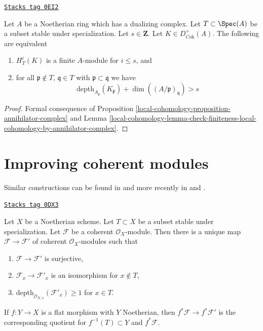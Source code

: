 \begin{proposition}
\label{local-cohomology-proposition-finiteness-complex}
\href{https://stacks.math.columbia.edu/tag/0EI2}{\texttt{Stacks tag 0EI2}}

Let $A$ be a Noetherian ring which has a dualizing complex.
Let $T \subset \Spec(A)$ be a subset stable under specialization.
Let $s \in \mathbf{Z}$. Let $K \in D_{\textit{Coh}}^+(A)$.
The following are equivalent
\begin{enumerate}
\item $H^i_T(K)$ is a finite $A$-module for $i \leq s$, and
\item for all $\mathfrak p \not \in T$, $\mathfrak q \in T$ with
$\mathfrak p \subset \mathfrak q$ we have
$$
\text{depth}_{A_\mathfrak p}(K_\mathfrak p) +
\dim((A/\mathfrak p)_\mathfrak q) > s
$$
\end{enumerate}
\end{proposition}

\begin{proof}
Formal consequence of
Proposition \ref{local-cohomology-proposition-annihilator-complex} and
Lemma \ref{local-cohomology-lemma-check-finiteness-local-cohomology-by-annihilator-complex}.
\end{proof}

\section{Improving coherent modules}
\label{local-cohomology-section-improve}
Similar constructions can be found in \cite{EGA} and more recently in
\cite{Kollar-local-global-hulls} and \cite{Kollar-variants}.

\begin{lemma}
\label{local-cohomology-lemma-get-depth-1-along-Z}
\href{https://stacks.math.columbia.edu/tag/0DX3}{\texttt{Stacks tag 0DX3}}

Let $X$ be a Noetherian scheme. Let $T \subset X$ be a subset
stable under specialization. Let $\mathcal{F}$ be a coherent
$\mathcal{O}_X$-module. Then there is a unique map
$\mathcal{F} \to \mathcal{F}'$ of coherent $\mathcal{O}_X$-modules
such that
\begin{enumerate}
\item $\mathcal{F} \to \mathcal{F}'$ is surjective,
\item $\mathcal{F}_x \to \mathcal{F}'_x$ is an isomorphism for $x \not \in T$,
\item $\text{depth}_{\mathcal{O}_{X, x}}(\mathcal{F}'_x) \geq 1$ for $x \in T$.
\end{enumerate}
If $f : Y \to X$ is a flat morphism with $Y$ Noetherian, then
$f^*\mathcal{F} \to f^*\mathcal{F}'$ is the corresponding
quotient for $f^{-1}(T) \subset Y$ and $f^*\mathcal{F}$.
\end{lemma}

